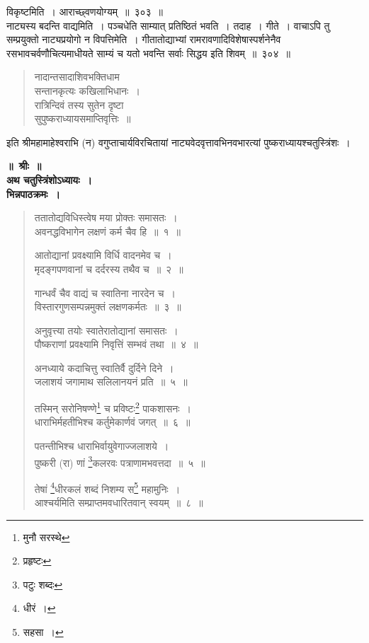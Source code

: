 \documentclass[11pt, openany]{book}
\begin{document}
{\qtt विकृष्टमिति}~। आराच्छ्वणयोग्यम्~॥~३०३~॥\\

नाट्यस्य बदन्ति वाद्यमिति~। पञ्चधेति साम्यात् प्रतिष्ठितं भवति~। तदाह~। गीते~। वाचाऽपि तु सम्प्रयुक्तो नाट्यप्रयोगो न विपत्तिमेति~। गीतातोद्याभ्यां रामरावणादिविशेषास्पर्शनेनैव रसभावचर्वणौचित्यमाधीयते साम्यं च यतो भवन्ति सर्वाः सिद्धय इति शिवम्~॥~३०४~॥

\begin{quote}
{\qt  नादान्तसादाशिवभक्तिधाम\\
 सन्तानकृत्यः कखिलाभिधानः~।\\
 रात्रिन्दिवं तस्य सुतेन दृष्टा\\
 सुपुष्कराध्यायसमाप्तिवृत्तिः~॥}
\end{quote}

\begin{center}
इति श्रीमहामाहेश्वराभि (न) वगुप्ताचार्यविरचितायां नाट्यवेदवृत्तावभिनवभारत्यां पुष्कराध्यायश्चतुस्त्रिंशः~। 
\end{center}

\newpage

\begin{center}
\textbf{\Large ॥~श्रीः~॥}\\

\vspace{2mm}
\textbf{\Large अथ चतुस्त्रिंशोऽध्यायः~।}\\

\vspace{2mm}
\textbf{\Large भिन्नपाठक्रमः~।}
\end{center}

\begin{quote}
{\na  ततातोद्यविधिस्त्वेष मया प्रोक्तः समासतः~।\\
 अवनद्धविभागेन लक्षणं कर्म चैव हि~॥~१~॥

 आतोद्यानां प्रवक्ष्यामि विर्धि वादनमेव च~।\\
 मृदङ्गपणवानां च दर्दरस्य तथैव च~॥~२~॥

 गान्धर्वं चैव वाद्यं च स्वातिना नारदेन च~।\\
 विस्तारगुणसम्पन्नमुक्तं लक्षणकर्मतः~॥~३~॥

 अनुवृत्त्या तयोः स्वातेरातोद्यानां समासतः~।\\
 पौष्कराणां प्रवक्ष्यामि निवृत्तिं सम्भवं तथा~॥~४~॥

 अनध्याये कदाचित्तु स्वातिर्वै दुर्दिने दिने~।\\
 जलाशयं जगामाथ सलिलानयनं प्रति~॥~५~॥

 तस्मिन् सरोनिषण्णे\renewcommand{\thefootnote}{1}\footnote{मुनौ सरस्थे} च प्रविष्टः\renewcommand{\thefootnote}{2}\footnote{प्रहृष्टः} पाकशासनः~।\\
 धाराभिर्महतीभिश्च कर्तुमेकार्णवं जगत्~॥~६~॥

 पतन्तीभिश्च धाराभिर्वायुवेगाज्जलाशये~।\\
 पुष्करी (रा) णां \renewcommand{\thefootnote}{3}\footnote{पटुः शब्दः}कलरवः पत्राणामभवत्तदा~॥~५~॥

 तेषां \renewcommand{\thefootnote}{4}\footnote{धीरं~।}धीरकलं शब्दं निशम्य स\renewcommand{\thefootnote}{5}\footnote{सहसा~।} महामुनिः~।\\
 आश्चर्यमिति सम्प्राप्तमवधारितवान् स्वयम्~॥~८~॥}
\end{quote}
\end{document}
